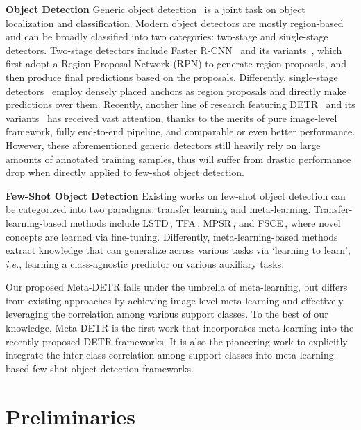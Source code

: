 \documentclass[letterpaper]{article} \usepackage{aaai22}  \usepackage{times}  \usepackage{helvet}  \usepackage{courier}  \usepackage[hyphens]{url}  \usepackage{graphicx} \urlstyle{rm} \def\UrlFont{\rm}  \usepackage{natbib}  \usepackage{caption} \DeclareCaptionStyle{ruled}{labelfont=normalfont,labelsep=colon,strut=off} \frenchspacing  \setlength{\pdfpagewidth}{8.5in}  \setlength{\pdfpageheight}{11in}  \usepackage{algorithm}
\begin{document}
\noindent\textbf{Object Detection\;\;}
Generic object detection~\citep{Liu2019DeepLF} is a joint task on object localization and classification. Modern object detectors are mostly region-based and can be broadly classified into two categories: two-stage and single-stage detectors. Two-stage detectors include Faster R-CNN~\citep{FasterRCNN} and its variants~\citep{relationnetworks_detection,CascadeRCNN,CADNet}, which first adopt a Region Proposal Network (RPN) to generate region proposals, and then produce final predictions based on the proposals. Differently, single-stage detectors~\citep{SSD,YOLO9000,RefineDet} employ densely placed anchors as region proposals and directly make predictions over them.
Recently, another line of research featuring DETR~\citep{DETR} and its variants~\citep{DeformableDETR,up-detr} has received vast attention, thanks to the merits of pure image-level framework, fully end-to-end pipeline, and comparable or even better performance.
However, these aforementioned generic detectors still heavily rely on large amounts of annotated training samples, thus will suffer from drastic performance drop when directly applied to few-shot object detection.

\smallskip
\noindent\textbf{Few-Shot Object Detection\;\;}
Existing works on few-shot object detection can be categorized into two paradigms: transfer learning and meta-learning. Transfer-learning-based methods include LSTD\,\citep{LSTD}, TFA\,\citep{fsdet}, MPSR\,\citep{MPSR}, and FSCE\,\citep{fsce}, where novel concepts are learned via fine-tuning. Differently, meta-learning-based methods\;\citep{FewshotReweighting,metarcnn,metadet,incrementalfsdet,FSDetView,fsod,DenseRelationDistillation} extract knowledge that can generalize across various tasks via `learning to learn', \textit{i.e.}, learning a class-agnostic predictor on various auxiliary tasks.

Our proposed Meta-DETR falls under the umbrella of meta-learning, but differs from existing approaches by achieving image-level meta-learning and effectively leveraging the correlation among various support classes. To the best of our knowledge, Meta-DETR is the first work that incorporates meta-learning into the recently proposed DETR frameworks; It is also the pioneering work to explicitly integrate the inter-class correlation among support classes into meta-learning-based few-shot object detection frameworks.



\section{Preliminaries}
\end{document}
